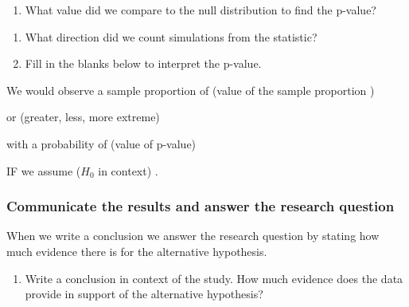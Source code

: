 \documentclass[
]{report}
\providecommand{\tightlist}{%
  \setlength{\itemsep}{0pt}\setlength{\parskip}{0pt}}
\begin{document}
\vspace{1in}

\begin{enumerate}
\def\labelenumi{\arabic{enumi}.}
\setcounter{enumi}{10}
\tightlist
\item
  What value did we compare to the null distribution to find the p-value?
\end{enumerate}

\vspace{0.3in}

\begin{enumerate}
\def\labelenumi{\arabic{enumi}.}
\setcounter{enumi}{11}
\item
  What direction did we count simulations from the statistic?
  \vspace{0.3in}
\item
  Fill in the blanks below to interpret the p-value.
\end{enumerate}


We would observe a sample proportion of (value of the sample proportion )\hrulefill  

or (greater, less, more extreme) \hrulefill   

with a probability of (value of p-value) \hrulefill  

IF we assume (\(H_0\) in context) \hrulefill.

\vspace{12pt}

\hypertarget{communicate-the-results-and-answer-the-research-question}{%
\subsubsection*{Communicate the results and answer the research question}\label{communicate-the-results-and-answer-the-research-question}}

When we write a conclusion we answer the research question by stating how much evidence there is for the alternative hypothesis.

\begin{enumerate}
\def\labelenumi{\arabic{enumi}.}
\setcounter{enumi}{13}
\tightlist
\item
  Write a conclusion in context of the study. How much evidence does the data provide in support of the alternative hypothesis?
\end{enumerate}
\end{document}
